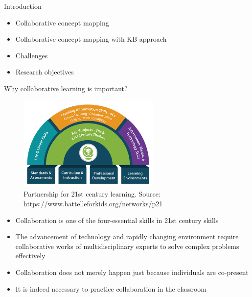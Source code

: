\begin{frame}{Introduction}
\begin{itemize}
  \item Collaborative concept mapping
  \item Collaborative concept mapping with KB approach
  \item Challenges
  \item Research objectives
\end{itemize}
\end{frame}


\begin{frame}[allowframebreaks]{Why collaborative learning is important?}

    \begin{figure}[tb]
        \begin{center}
            \includegraphics[width=70mm]{images/p21centuryskills.png}
        \end{center}
        \caption{Partnership for 21st century learning. Source: https://www.battelleforkids.org/networks/p21}
        \label{intro::p21}
    \end{figure}

    \begin{itemize}
        \item Collaboration is one of the four-essential skills in 21st century skills
        \item The advancement of technology and rapidly changing environment require 
        collaborative works of multidisciplinary experts to solve complex problems effectively
        \item Collaboration does not merely happen just because individuals are co-present
        \item It is indeed necessary to practice collaboration in the classroom
    \end{itemize}
\end{frame}

